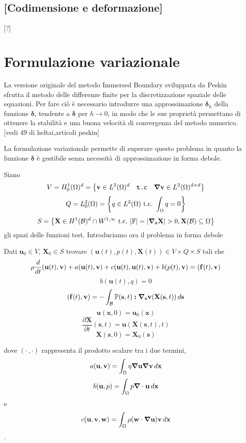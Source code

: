 \subsection{[Codimensione e deformazione]}
[?]

\section{Formulazione variazionale}
La versione originale del metodo Immersed Boundary sviluppata da Peskin sfrutta il metodo delle differenze finite per la discretizzazione spaziale delle equazioni. Per fare ciò è necessario introdurre una approssimazione $\boldsymbol{\delta}_h$ della funzione $\boldsymbol{\delta}$, tendente a $\boldsymbol{\delta}$ per $h\to 0$, in modo che le sue proprietà permettano di ottenere la stabilità e una buona velocità di convergenza del metodo numerico.[vedi 49 di heltai,articoli peskin]

La formulazione variazionale permette di superare questo problema in quanto la funzione $\boldsymbol{\delta}$ è gestibile senza necessità di approssimazione in forma debole.

Siano 
$$V=H^1_0(\Omega)^d=\left \{ \mathbf{v}\in L^2(\Omega)^d\quad\texttt{t.c}\quad\boldsymbol{\nabla}\mathbf{v}\in L^2(\Omega)^{d\times d} \right \}$$
$$Q=L^2_0(\Omega)=\left \{q\in L^2(\Omega)\ \text{t.c.}\ \int_{\Omega}q=0 \right \}$$ 
$$S=\left \{\mathbf{X}\in H^1(\mathcal{B})^d\cap W^{1,\infty}\ \text{t.c.}\ \vert\mathbb{F}\vert =\vert\boldsymbol{\nabla}_{\mathbf{s}}\mathbf{X}\vert>0,\mathbf{X}(\mathcal{B})\subseteq\Omega \right \}$$
gli spazi delle funzioni test. Introduciamo ora il problema in forma debole
\begin{problem}
Dati $\mathbf{u}_0\in V$, $\mathbf{X}_0\in S$ trovare $(\mathbf{u}(t),p(t),\mathbf{X}(t))\in V\times Q\times S$ tali che
$$\rho\frac{d}{dt}\ps{\mathbf{u}(t)}{\mathbf{v}}+a\ps{\mathbf{u}(t)}{\mathbf{v}}+c({\mathbf{u}(t)},{\mathbf{u}(t)},{\mathbf{v}})+b(p(t),\mathbf{v})=\ps{\mathbf{f}(t)}{\mathbf{v}}$$
$$b(\mathbf{u}(t),q)=0$$
$$\ps{\mathbf{f}(t)}{\mathbf{v}}=-\int_{\mathcal{B}}\mathbb{P}(\mathbf{s},t)\boldsymbol{:}\Nabla_{\mathbf{s}}\mathbf{v}(\mathbf{X}(\mathbf{s},t))\, d\mathbf{s}$$
$$\mathbf{u}(\mathbf{x},0)=\mathbf{u}_0(\mathbf{x})$$
$$\frac{\partial\mathbf{X}}{\partial t}(\mathbf{s},t)=\mathbf{u}(\mathbf{X}(\mathbf{s},t),t)$$
$$\mathbf{X}(\mathbf{s},0)=\mathbf{X}_0(\mathbf{s})$$
\end{problem}
dove $(\cdot\,,\cdot)$ rappresenta il prodotto scalare tra i due termini,
$$a(\mathbf{u},\mathbf{v})= \int_\Omega\eta\boldsymbol{\nabla}\mathbf{u}\boldsymbol{\nabla}\mathbf{v}\, d\mathbf{x}$$
$$b(\mathbf{u},p)=\int_\Omega p\boldsymbol{\nabla}\cdot\mathbf{u}\, d\mathbf{x}$$ e 
$$c(\mathbf{u},\mathbf{v},\mathbf{w})=\int_\Omega\rho(\mathbf{w}\cdot\boldsymbol{\nabla}\mathbf{u})\mathbf{v}\, d\mathbf{x}$$.


